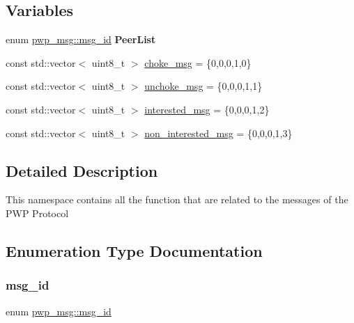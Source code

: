\subsection*{Variables}
\begin{DoxyCompactItemize}
\item 
\mbox{\label{namespacepwp__msg_ae962e65b1871714756b6aeb4722a8caf}} 
enum \hyperlink{namespacepwp__msg_a0b9a29508f00a30e5138d2b78f4b1daf}{pwp\+\_\+msg\+::msg\+\_\+id} {\bfseries Peer\+List}
\item 
const std\+::vector$<$ uint8\+\_\+t $>$ \hyperlink{namespacepwp__msg_a695ee2efb59a7c258559f19440fe6998}{choke\+\_\+msg} = \{0,0,0,1,0\}
\item 
const std\+::vector$<$ uint8\+\_\+t $>$ \hyperlink{namespacepwp__msg_acdc5eb698534e84a15db0e061c511e7c}{unchoke\+\_\+msg} = \{0,0,0,1,1\}
\item 
const std\+::vector$<$ uint8\+\_\+t $>$ \hyperlink{namespacepwp__msg_afc68b17ce131c52fa0beb0cc7185778b}{interested\+\_\+msg} = \{0,0,0,1,2\}
\item 
const std\+::vector$<$ uint8\+\_\+t $>$ \hyperlink{namespacepwp__msg_a16a5f22f784d872342a82af9f6b77830}{non\+\_\+interested\+\_\+msg} = \{0,0,0,1,3\}
\end{DoxyCompactItemize}


\subsection{Detailed Description}
This namespace contains all the function that are related to the messages of the P\+WP Protocol 

\subsection{Enumeration Type Documentation}
\mbox{\label{namespacepwp__msg_a0b9a29508f00a30e5138d2b78f4b1daf}} 
\subsubsection{\texorpdfstring{msg\+\_\+id}{msg\_id}}
{\footnotesize\ttfamily enum \hyperlink{namespacepwp__msg_a0b9a29508f00a30e5138d2b78f4b1daf}{pwp\+\_\+msg\+::msg\+\_\+id}}

